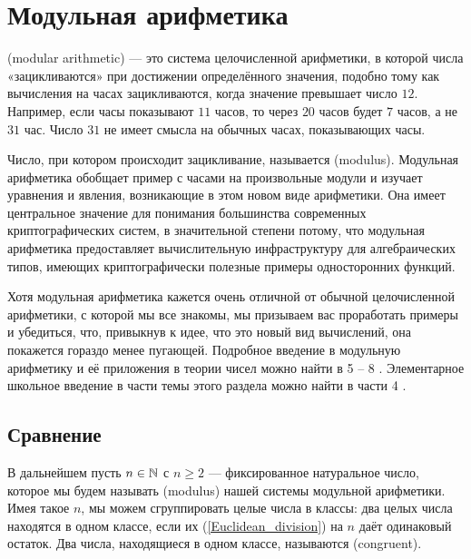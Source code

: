\section{Модульная арифметика}
\label{modular_arithmetic}
 (modular arithmetic) — это система целочисленной арифметики, в которой числа «зацикливаются» при достижении определённого значения, подобно тому как вычисления на часах зацикливаются, когда значение превышает число $12$. Например, если часы показывают $11$ часов, то через $20$ часов будет $7$ часов, а не $31$ час. Число $31$ не имеет смысла на обычных часах, показывающих часы.

Число, при котором происходит зацикливание, называется  (modulus). Модульная арифметика обобщает пример с часами на произвольные модули и изучает уравнения и явления, возникающие в этом новом виде арифметики. Она имеет центральное значение для понимания большинства современных криптографических систем, в значительной степени потому, что модульная арифметика предоставляет вычислительную инфраструктуру для алгебраических типов, имеющих криптографически полезные примеры односторонних функций.\

Хотя модульная арифметика кажется очень отличной от обычной целочисленной арифметики, с которой мы все знакомы, мы призываем вас проработать примеры и убедиться, что, привыкнув к идее, что это новый вид вычислений, она покажется гораздо менее пугающей. Подробное введение в модульную арифметику и её приложения в теории чисел можно найти в \chaptname{} 5 – 8 \cite{hardy-2008}. Элементарное школьное введение в части темы этого раздела можно найти в части 4 \cite{wu-1}.

\subsection{Сравнение}
В дальнейшем пусть $n\in\mathbb{N}$ с $n\geq 2$ — фиксированное натуральное число, которое мы будем называть  (modulus) нашей системы модульной арифметики. Имея такое $n$, мы можем сгруппировать целые числа в классы: два целых числа находятся в одном классе, если их  (\ref{Euclidean_division}) на $n$ даёт одинаковый остаток. Два числа, находящиеся в одном классе, называются  (congruent).

